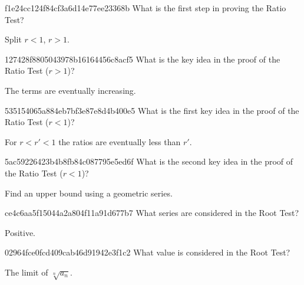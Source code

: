 \begin{note}{f1e24cc124f84cf3a6d14e77ee23368b}
    What is the first step in proving the Ratio Test?

    \begin{cloze}{1}
        Split \({ r < 1 }\), \({ r > 1 }\).
    \end{cloze}
\end{note}

\begin{note}{127428f8805043978b16164456c8acf5}
    What is the key idea in the proof of the Ratio Test (\({ r > 1 }\))?

    \begin{cloze}{1}
        The terms are eventually increasing.
    \end{cloze}
\end{note}

\begin{note}{535154065a884eb7bf3e87e8d4b400e5}
    What is the first key idea in the proof of the Ratio Test (\({ r < 1 }\))?

    \begin{cloze}{1}
        For \({ r < r' < 1 }\) the ratios are eventually less than \({ r' }\).
    \end{cloze}
\end{note}

\begin{note}{5ac59226423b4b8fb84c087795e5ed6f}
    What is the second key idea in the proof of the Ratio Test (\({ r < 1 }\))?

    \begin{cloze}{1}
        Find an upper bound using a geometric series.
    \end{cloze}
\end{note}

\begin{note}{ce4c6aa5f15044a2a804f11a91d677b7}
    What series are considered in the Root Test?

    \begin{cloze}{1}
        Positive.
    \end{cloze}
\end{note}

\begin{note}{02964fce0fcd409cab46d91942e3f1c2}
    What value is considered in the Root Test?

    \begin{cloze}{1}
        The limit of \({ \sqrt[n]{a_n} }\).
    \end{cloze}
\end{note}

